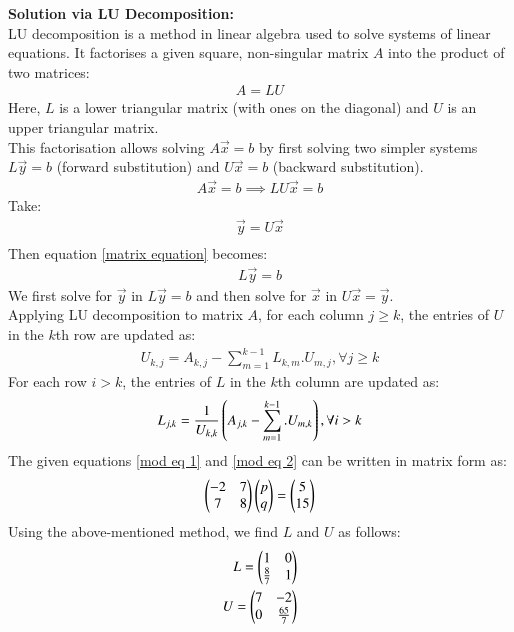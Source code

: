 \documentclass[journal]{IEEEtran}
\begin{document}
\textbf{Solution via LU Decomposition:}\\
LU decomposition is a method in linear algebra used to solve systems of linear equations. It factorises a given square, non-singular matrix $A$ into the product of two matrices:
\begin{align}
    A = LU
\end{align}
Here, $L$ is a lower triangular matrix (with ones on the diagonal) and $U$ is an upper triangular matrix. \\
This factorisation allows solving $A\vec{x} = b$ by first solving two simpler systems $L\vec{y} = b$ (forward substitution) and $U\vec{x} = b$ (backward substitution). \\
\begin{align}
    A\vec{x} = b
    \implies LU\vec{x} = b \label{matrix equation}
\end{align}
Take:
\begin{align}
    \vec{y} = U\vec{x} \\
\end{align}
Then equation \eqref{matrix equation} becomes:
\begin{align}
    L\vec{y} = b
\end{align}
We first solve for $\vec{y}$ in $L\vec{y} = b$ and then solve for $\vec{x}$ in $U\vec{x} = \vec{y}$.\\
Applying LU decomposition to matrix $A$, for each column $j \geq k$, the entries of $U$ in the $k$th row are updated as:
\begin{align}
    U_{k,j} = A_{k,j} - \sum_{m=1}^{k-1} L_{k,m}.U_{m,j},   \forall{j \geq k}
\end{align}
For each row $i > k$, the entries of $L$ in the $k$th column are updated as:
\begin{align}
    L_{j,k} = \frac{1}{U_{k,k}}\left(A_{j,k} - \sum_{m=1}^{k-1}.U_{m,k}\right), \forall{i>k}
\end{align}
The given equations \eqref{mod eq 1} and \eqref{mod eq 2} can be written in matrix form as:
\begin{align}
    \begin{pmatrix}-2 & 7 \\ 7 & 8\end{pmatrix}\begin{pmatrix}p \\ q\end{pmatrix} = \begin{pmatrix}5 \\ 15\end{pmatrix}
\end{align}
Using the above-mentioned method, we find $L$ and $U$ as follows:
\begin{align}
    L=\begin{pmatrix}1 & 0\\ \frac{8}{7} & 1 \end{pmatrix} \\
    U=\begin{pmatrix}7 & -2\\ 0 & \frac{65}{7} \end{pmatrix}
\end{align}
\end{document}

